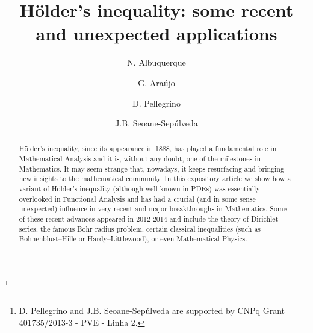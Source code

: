 \documentclass[10pt]{amsart}
\numberwithin{equation}{section}
\begin{document}
\title{H\"{o}lder's inequality: some recent and unexpected applications}
\author[Albuquerque]{N. Albuquerque}
\address{Departamento de Matem\'{a}tica, \\
\indent Universidade Federal da Para\'{\i}ba, \\
-900 - Jo\~{a}o Pessoa, Brazil.}
\author[Ara\'{u}jo]{G. Ara\'{u}jo}
\address{Departamento de Matem\'{a}tica, \\
\indent Universidade Federal da Para\'{\i}ba, \\
-900 - Jo\~{a}o Pessoa, Brazil.}
\author[Pellegrino]{D. Pellegrino}
\address{Departamento de Matem\'{a}tica, \\
\indent Universidade Federal da Para\'{\i}ba, \\
-900 - Jo\~{a}o Pessoa, Brazil.}
\author[Seoane]{J.B. Seoane-Sep\'{u}lveda}
\address{Departamento de An\'{a}lisis Matem\'{a}tico,\\
\indent Facultad de Ciencias Matem\'{a}ticas, \\
\indent Plaza de Ciencias 3, \\
\indent Universidad Complutense de Madrid,\\
\indent Madrid, 28040, Spain.\\
\indent
\textsc{\ and }\\
\indent
Instituto de Ciencias Matem\'aticas -- ICMAT \\
\indent Madrid, Spain.}
\thanks{D. Pellegrino and J.B. Seoane-Sep\'ulveda are supported by CNPq
Grant 401735/2013-3 - PVE - Linha 2.}

\begin{abstract}
H\"{o}lder's inequality, since its appearance in 1888, has played a
fundamental role in Mathematical Analysis and it is, without any doubt, one
of the milestones in Mathematics. It may seem strange that, nowadays, it
keeps resurfacing and bringing new insights to the mathematical community.
In this expository article we show how a variant of H\"{o}lder's inequality
(although well-known in PDEs) was essentially overlooked in Functional
Analysis and has had a crucial (and in some sense unexpected) influence in
very recent and major breakthroughs in Mathematics. Some of these recent
advances appeared in 2012-2014 and include the theory of Dirichlet series,
the famous Bohr radius problem, certain classical inequalities (such as
Bohnenblust--Hille or Hardy--Littlewood), or even Mathematical Physics.
\end{abstract}
\end{document}
